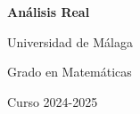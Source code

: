 \documentclass[a4paper, 11pt, oneside]{report}
\begin{document}
\begin{titlepage}

  \centering

  {\fontsize{50}{60}\textbf{Análisis Real}}

  \vspace{4\baselineskip}

  {\fontsize{15}{18}
  
  Universidad de Málaga

  \vspace{0.5\baselineskip}

  Grado en Matemáticas

  \vspace{0.5\baselineskip} %

  Curso 2024-2025}

  \vspace{4\baselineskip}

  \begin{figure}[H]
    \centering
    \begin{subfigure}[b]{0.49\textwidth}
      \centering
    \end{subfigure}
    \begin{subfigure}[b]{0.49\textwidth}
      \centering
    \end{subfigure}
  \end{figure}
  

\end{titlepage}
\end{document}
